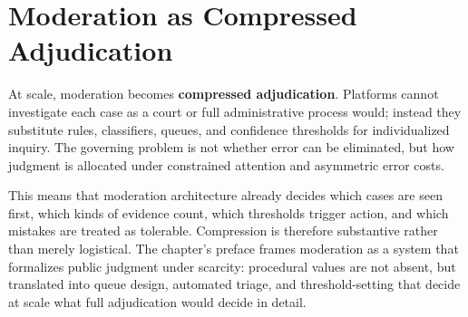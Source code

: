 
\chapter{Moderation as Compressed Adjudication}
\label{ch:ch066}


At scale, moderation becomes \textbf{compressed adjudication}. Platforms cannot investigate each case as a court or full administrative process would; instead they substitute rules, classifiers, queues, and confidence thresholds for individualized inquiry. The governing problem is not whether error can be eliminated, but how judgment is allocated under constrained attention and asymmetric error costs.

This means that moderation architecture already decides which cases are seen first, which kinds of evidence count, which thresholds trigger action, and which mistakes are treated as tolerable. Compression is therefore substantive rather than merely logistical. The chapter's preface frames moderation as a system that formalizes public judgment under scarcity: procedural values are not absent, but translated into queue design, automated triage, and threshold-setting that decide at scale what full adjudication would decide in detail.
